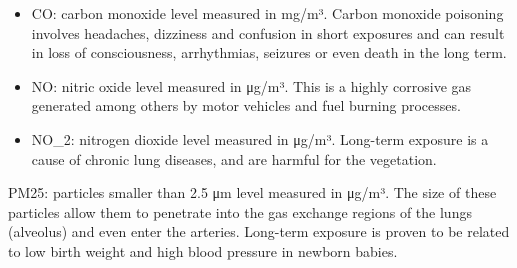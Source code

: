 \documentclass[
]{article}
\begin{document}
\begin{itemize}
\item
  CO: carbon monoxide level measured in mg/m³. Carbon monoxide poisoning
  involves headaches, dizziness and confusion in short exposures and can
  result in loss of consciousness, arrhythmias, seizures or even death
  in the long term.
\item
  NO: nitric oxide level measured in μg/m³. This is a highly corrosive
  gas generated among others by motor vehicles and fuel burning
  processes.
\item
  NO\_2: nitrogen dioxide level measured in μg/m³. Long-term exposure is
  a cause of chronic lung diseases, and are harmful for the vegetation.
\end{itemize}

PM25: particles smaller than 2.5 μm level measured in μg/m³. The size of
these particles allow them to penetrate into the gas exchange regions of
the lungs (alveolus) and even enter the arteries. Long-term exposure is
proven to be related to low birth weight and high blood pressure in
newborn babies.
\end{document}
